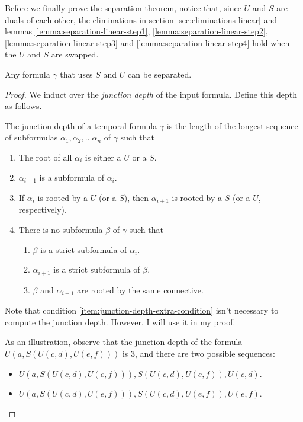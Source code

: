 \documentclass[a4paper,UKenglish,cleveref, autoref, thm-restate, numberwithinsect]{lipics-v2021}
\begin{document}
Before we finally prove the separation theorem, notice that, since $U$ and $S$ are duals of each other, the eliminations in section \ref{sec:eliminations-linear} and lemmas \ref{lemma:separation-linear-step1}, \ref{lemma:separation-linear-step2}, \ref{lemma:separation-linear-step3} and \ref{lemma:separation-linear-step4} hold when the $U$ and $S$ are swapped.
\begin{theorem}
    \label{theorem:separation-linear-final}
    Any formula $\gamma$ that uses $S$ and $U$ can be separated.
\end{theorem}
\begin{proof}
    We induct over the \textit{junction depth} of the input formula. Define this depth as follows.
    \begin{definition}
        The junction depth of a temporal formula $\gamma$ is the length of the longest sequence of subformulas $\alpha_1, \alpha_2, \ldots \alpha_n$ of $\gamma$ such that
        \begin{enumerate}
            \item The root of all $\alpha_i$ is either a $U$ or a $S$.
            \item $\alpha_{i+1}$ is a subformula of $\alpha_i$.
            \item If $\alpha_i$ is rooted by a $U$ (or a $S$), then $\alpha_{i+1}$ is rooted by a $S$ (or a $U$, respectively).
            \item There is no subformula $\beta$ of $\gamma$ such that \label{item:junction-depth-extra-condition}
                \begin{enumerate}
                    \item $\beta$ is a strict subformula of $\alpha_i$.
                    \item $\alpha_{i+1}$ is a strict subformula of $\beta$.
                    \item $\beta$ and $\alpha_{i+1}$ are rooted by the same connective.
                \end{enumerate}
        \end{enumerate}
    \end{definition}
    Note that condition \ref{item:junction-depth-extra-condition} isn't necessary to compute the junction depth. However, I will use it in my proof.

    As an illustration, observe that the junction depth of the formula $U \left(a, S\left( U(c, d), U(e, f) \right) \right)$ is 3, and there are two possible sequences:
    \begin{itemize}
        \item $U \left(a, S\left( U(c, d), U(e, f) \right) \right), S(U(c, d), U(e, f)), U(c, d)$.
        \item $U \left(a, S\left( U(c, d), U(e, f) \right) \right), S(U(c, d), U(e, f)), U(e, f)$.
    \end{itemize}


\end{proof}
\end{document}
